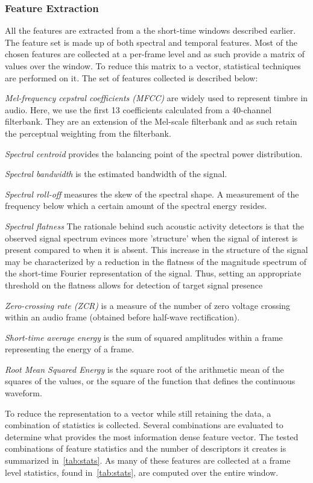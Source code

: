\subsubsection{Feature Extraction}
All the features are extracted from a the short-time windows described earlier. 
The feature set is made up of both spectral and temporal features. Most of the chosen features are collected at a per-frame level and as such provide a matrix of values over the window. To reduce this matrix to a vector, statistical techniques are performed on it. The set of features collected is described below:

\textit{Mel-frequency cepstral coefficients (MFCC)} are widely used to represent timbre in audio. Here, we use the first 13 coefficients calculated from a 40-channel filterbank. They are an extension of the Mel-scale filterbank and as such retain the perceptual weighting from the filterbank.

\textit{Spectral centroid} provides the balancing point of the spectral power distribution.

\textit{Spectral bandwidth} is the estimated bandwidth of the signal.

\textit{Spectral roll-off} measures the skew of the spectral shape. A measurement of the frequency below which a certain amount of the spectral energy resides.

\textit{Spectral flatness} The rationale
behind such acoustic activity detectors is that the observed signal
spectrum evinces more 'structure' when the signal of interest is
present compared to when it is absent. This increase in the structure
of the signal may be characterized by a reduction in the flatness of
the magnitude spectrum of the short-time Fourier representation of the
signal. Thus, setting an appropriate threshold on the flatness allows
for detection of target signal presence


\textit{Zero-crossing rate (ZCR)} is a measure of the number of zero voltage crossing within an audio frame (obtained before half-wave rectification).

\textit{Short-time average energy} is the sum of squared amplitudes within a frame representing the energy of a frame.

\textit{Root Mean Squared Energy} is the square root of the arithmetic mean of the squares of the values, or the square of the function that defines the continuous waveform.

To reduce the representation to a vector while still retaining the data, a
combination of statistics is collected. Several combinations are evaluated to determine what provides the most information dense feature vector. The tested combinations of feature statistics and the number of descriptors it creates is summarized in~\cref{tab:stats}.
As many of these features are collected at a frame level statistics, found
in~\cref{tab:stats}, are computed over the entire window.

